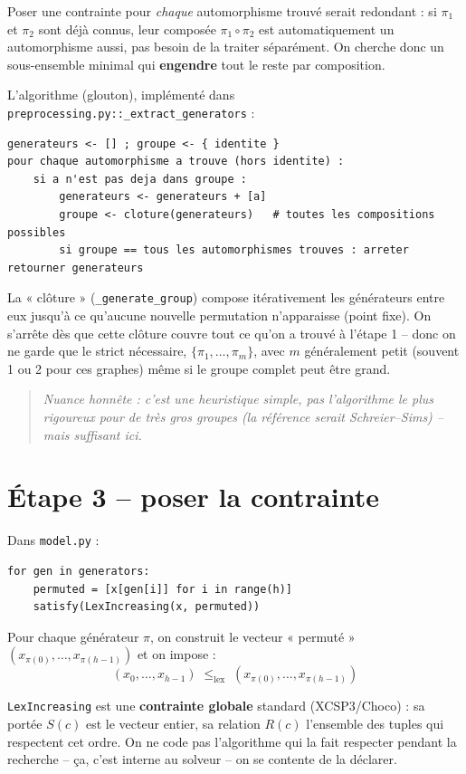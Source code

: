 \documentclass[11pt,a4paper]{article}
\begin{document}
Poser une contrainte pour \emph{chaque} automorphisme trouvé serait
redondant : si $\pi_1$ et $\pi_2$ sont déjà connus, leur composée
$\pi_1 \circ \pi_2$ est automatiquement un automorphisme aussi, pas
besoin de la traiter séparément. On cherche donc un sous-ensemble
minimal qui \textbf{engendre} tout le reste par composition.

L'algorithme (glouton), implémenté dans
\texttt{preprocessing.py::\_extract\_generators} :

\begin{lstlisting}
generateurs <- [] ; groupe <- { identite }
pour chaque automorphisme a trouve (hors identite) :
    si a n'est pas deja dans groupe :
        generateurs <- generateurs + [a]
        groupe <- cloture(generateurs)   # toutes les compositions possibles
        si groupe == tous les automorphismes trouves : arreter
retourner generateurs
\end{lstlisting}

La « clôture » (\texttt{\_generate\_group}) compose itérativement les
générateurs entre eux jusqu'à ce qu'aucune nouvelle permutation
n'apparaisse (point fixe). On s'arrête dès que cette clôture couvre
tout ce qu'on a trouvé à l'étape 1 -- donc on ne garde que le strict
nécessaire, $\{\pi_1,\dots,\pi_m\}$, avec $m$ généralement petit
(souvent 1 ou 2 pour ces graphes) même si le groupe complet peut être
grand.

\begin{quote}
\small\textit{Nuance honnête : c'est une heuristique simple, pas
l'algorithme le plus rigoureux pour de très gros groupes (la référence
serait Schreier--Sims) -- mais suffisant ici.}
\end{quote}

\section{Étape 3 -- poser la contrainte}

Dans \texttt{model.py} :

\begin{lstlisting}
for gen in generators:
    permuted = [x[gen[i]] for i in range(h)]
    satisfy(LexIncreasing(x, permuted))
\end{lstlisting}

Pour chaque générateur $\pi$, on construit le vecteur « permuté »
$(x_{\pi(0)}, \dots, x_{\pi(h-1)})$ et on impose :
\[
  (x_0, \dots, x_{h-1}) \;\le_{\text{lex}}\; (x_{\pi(0)}, \dots, x_{\pi(h-1)})
\]

\texttt{LexIncreasing} est une \textbf{contrainte globale} standard
(XCSP3/Choco) : sa portée $S(c)$ est le vecteur entier, sa relation
$R(c)$ l'ensemble des tuples qui respectent cet ordre. On ne code pas
l'algorithme qui la fait respecter pendant la recherche -- ça, c'est
interne au solveur -- on se contente de la déclarer.
\end{document}
